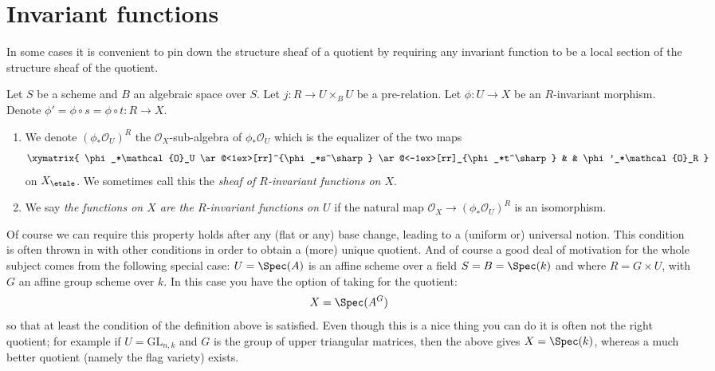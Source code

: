 \section{Invariant functions}
\label{section-functions}

\noindent
In some cases it is convenient to pin down the structure sheaf
of a quotient by requiring any invariant function to be a local
section of the structure sheaf of the quotient.

\begin{definition}
\label{definition-functions}
Let $S$ be a scheme and $B$ an algebraic space over $S$.
Let $j : R \to U \times_B U$ be a pre-relation.
Let $\phi : U \to X$ be an $R$-invariant morphism.
Denote $\phi' = \phi \circ s = \phi \circ t : R \to X$.
\begin{enumerate}
\item We denote $(\phi_*\mathcal{O}_U)^R$ the $\mathcal{O}_X$-sub-algebra
of $\phi_*\mathcal{O}_U$ which is the equalizer of the two maps
$$
\xymatrix{
\phi_*\mathcal{O}_U
\ar@<1ex>[rr]^{\phi_*s^\sharp}
\ar@<-1ex>[rr]_{\phi_*t^\sharp}
& &
\phi'_*\mathcal{O}_R
}
$$
on $X_\etale$. We sometimes call this the
{\it sheaf of $R$-invariant functions on $X$}.
\item We say {\it the functions on $X$ are the $R$-invariant functions on
$U$} if the natural map $\mathcal{O}_X \to (\phi_*\mathcal{O}_U)^R$
is an isomorphism.
\end{enumerate}
\end{definition}

\noindent
Of course we can require this property holds after any
(flat or any) base change, leading to a (uniform or) universal notion.
This condition is often thrown in
with other conditions in order to obtain a (more) unique quotient. And of
course a good deal of motivation for the whole subject comes from the following
special case: $U = \Spec(A)$ is an affine scheme over a field
$S = B = \Spec(k)$ and where $R = G \times U$, with
$G$ an affine group scheme over $k$. In this case
you have the option of taking for the quotient:
$$
X = \Spec(A^G)
$$
so that at least the condition of the definition above is satisfied.
Even though this is a nice thing you can do it is often not the right
quotient; for example if $U = \text{GL}_{n, k}$ and $G$ is the group of
upper triangular matrices, then the above gives $X = \Spec(k)$, whereas
a much better quotient (namely the flag variety) exists.








